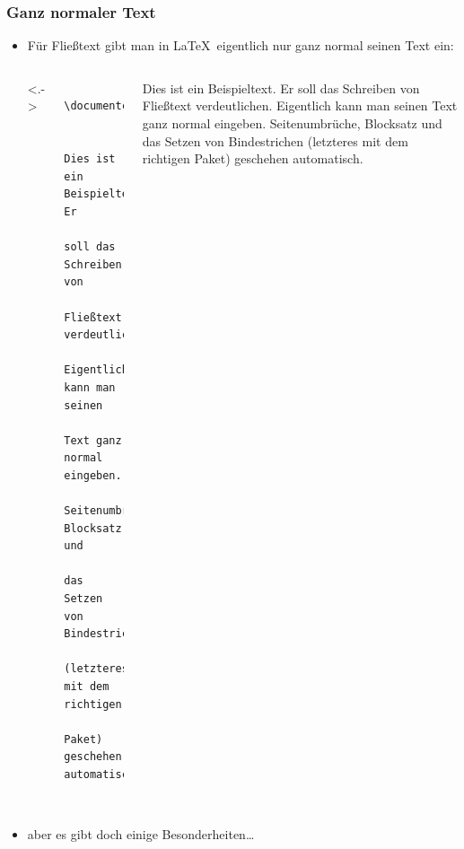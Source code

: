 \begin{frame}[<+->][fragile]
	\frametitle{Ganz normaler Text}
	
	\lstset{frame=L, numbers=left, xleftmargin=0.5cm}
	\begin{itemize}
		\item Für Fließtext gibt man in \LaTeX\ eigentlich nur ganz normal seinen Text ein:
		\begin{columns}<.->
			\begin{lstlisting}
			\documentclass{scrartcl}
			
			Dies ist ein Beispieltext. Er
			soll das Schreiben von
			Fließtext verdeutlichen.
			Eigentlich kann man seinen
			Text ganz normal eingeben.
			Seitenumbrüche, Blocksatz und
			das Setzen von Bindestrichen
			(letzteres mit dem richtigen
			Paket) geschehen automatisch.
			
			\end{lstlisting}
			\justifying\rmfamily
			Dies ist ein Beispieltext. Er
			soll das Schreiben von Fließtext
			verdeutlichen. Eigentlich kann
			man seinen Text ganz normal
			eingeben. Seitenumbrüche,
			Blocksatz und das Setzen von
			Bindestrichen (letzteres mit
			dem richtigen Paket) geschehen
			automatisch.
		\end{columns}
		\item aber es gibt doch einige Besonderheiten…
	\end{itemize}
\end{frame}

